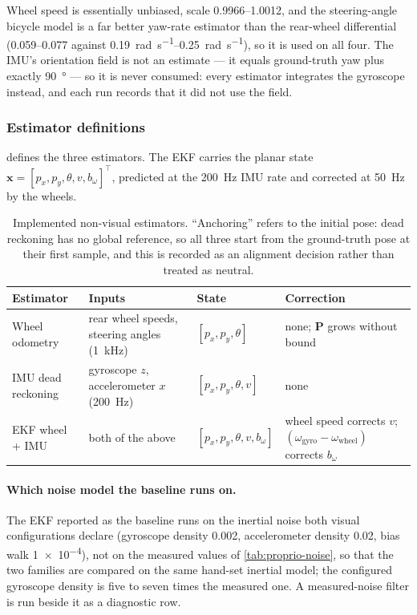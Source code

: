 Wheel speed is essentially unbiased, scale \numrange{0.9966}{1.0012}, and the
steering-angle bicycle model is a far better yaw-rate estimator than the
rear-wheel differential (\SIrange{0.059}{0.077}{} against
\SIrange{0.19}{0.25}{\radian\per\second}), so it is used on all four. The
IMU's orientation field is not an estimate --- it equals ground-truth yaw plus
exactly \SI{90}{\degree} --- so it is never consumed: every estimator integrates
the gyroscope instead, and each run records that it did not use the field.

\subsubsection{Estimator definitions}

 defines the three estimators. The EKF carries the
planar state $\mathbf{x}=[p_x,p_y,\theta,v,b_\omega]^{\top}$, predicted at the
\SI{200}{\hertz} IMU rate and corrected at \SI{50}{\hertz} by the wheels.

\begin{table}[htbp]
\centering
\caption[Implemented non-visual estimators.]{Implemented non-visual estimators. ``Anchoring'' refers to the initial
pose: dead reckoning has no global reference, so all three start from the
ground-truth pose at their first sample, and this is recorded as an alignment
decision rather than treated as neutral.}
\label{tab:proprio-estimators}
\small
\begin{tabularx}{\textwidth}{>{\raggedright\arraybackslash}p{}>{\raggedright\arraybackslash}p{}>{\raggedright\arraybackslash}p{}>{\raggedright\arraybackslash}X}
\toprule
Estimator & Inputs & State & Correction \\
\midrule
Wheel odometry & rear wheel speeds, steering angles (\SI{1}{\kilo\hertz}) &
  $[p_x,p_y,\theta]$ & none; $\mathbf{P}$ grows without bound \\
IMU dead reckoning & gyroscope $z$, accelerometer $x$ (\SI{200}{\hertz}) &
  $[p_x,p_y,\theta,v]$ & none \\
EKF wheel + IMU & both of the above & $[p_x,p_y,\theta,v,b_\omega]$ & wheel speed
  corrects $v$; $(\omega_{\text{gyro}}-\omega_{\text{wheel}})$ corrects
  $b_\omega$ \\
\bottomrule
\end{tabularx}
\end{table}

\paragraph{Which noise model the baseline runs on.} The EKF reported as the
baseline runs on the inertial noise both visual configurations declare
(gyroscope density \num{0.002}, accelerometer density \num{0.02}, bias walk
\num{1e-4}), not on the measured values of \cref{tab:proprio-noise}, so that
the two families are compared on the same hand-set inertial model; the
configured gyroscope density is five to seven times the measured one. A
measured-noise filter is run beside it as a diagnostic row.

